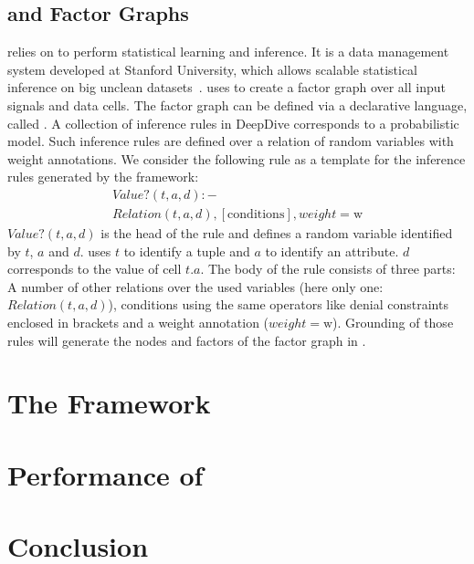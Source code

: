   \subsection{\deepdive{} and Factor Graphs}
  \holoclean{} relies on \deepdive{} to perform statistical learning and inference.
  It is a data management system developed at Stanford University, which allows scalable statistical inference on big unclean datasets~\cite{deepdive}.
  \holoclean{} uses \deepdive{} to create a factor graph over all input signals and data cells.
  The factor graph can be defined via a declarative language, called \ddlog{}.
  A collection of inference rules in DeepDive corresponds to a probabilistic model.
  Such inference rules are defined over a relation of random variables with weight annotations.
  We consider the following \ddlog{} rule as a template for the inference rules generated by the \holoclean{} framework:
  \begin{multline}
    Value?(t,a,d):-\\Relation(t,a,d), [\text{conditions}], weight=\text{w}
  \end{multline}
  $Value?(t,a,d)$ is the head of the rule and defines a random variable identified by $t$, $a$ and $d$.
  \holoclean{} uses $t$ to identify a tuple and $a$ to identify an attribute.
  $d$ corresponds to the value of cell $t.a$.
  The body of the rule consists of three parts:
  A number of other relations over the used variables (here only one: $Relation(t,a,d)$),
  conditions using the same operators like denial constraints enclosed in brackets and
  a weight annotation ($weight=\text{w}$).
  Grounding of those rules will generate the nodes and factors of the factor graph in \deepdive{}.
  

\section{The \holoclean{} Framework}\label{sec:framework}

\section{Performance of \holoclean{}}\label{sec:performance}

\section{Conclusion}\label{sec:conclusion}